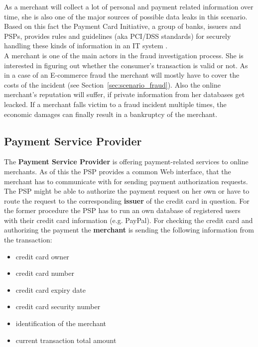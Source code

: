 As a merchant will collect a lot of personal and payment related information over time, she is also one of the major sources of possible data leaks in this scenario. Based on this fact the Payment Card Initiative, a group of banks, issuers and \gls{PSP}s, provides rules and guidelines (aka PCI/DSS standards) for securely handling these kinds of information in an IT system \citep{dss2014payment}. \\

A merchant is one of the main actors in the fraud investigation process. She is interested in figuring out whether the consumer's transaction is valid or not. As in a case of an E-commerce fraud the merchant will mostly have to cover the costs of the incident (see Section~\ref{sec:scenario_fraud}). Also the online merchant's reputation will suffer, if private information from her databases get leacked. If a merchant falls victim to a fraud incident multiple times, the economic damages can finally result in a bankruptcy of the merchant.


\subsection{Payment Service Provider}
\label{subsec:stakeholder_psp}

The \textbf{Payment Service Provider} is offering payment-related services to online merchants. As of this the \gls{PSP} provides a common Web interface, that the merchant has to communicate with for sending payment authorization requests. The \gls{PSP} might be able to authorize the payment request on her own or have to route the request to the corresponding \textbf{issuer} of the credit card in question. For the former procedure the \gls{PSP} has to run an own database of registered users with their credit card information (e.g. PayPal). For checking the credit card and authorizing the payment the \textbf{merchant} is sending the following information from the transaction:\@

\begin{itemize}
		\item credit card owner
		\item credit card number
		\item credit card expiry date
		\item credit card security number
		\item identification of the merchant
		\item current transaction total amount
\end{itemize}

